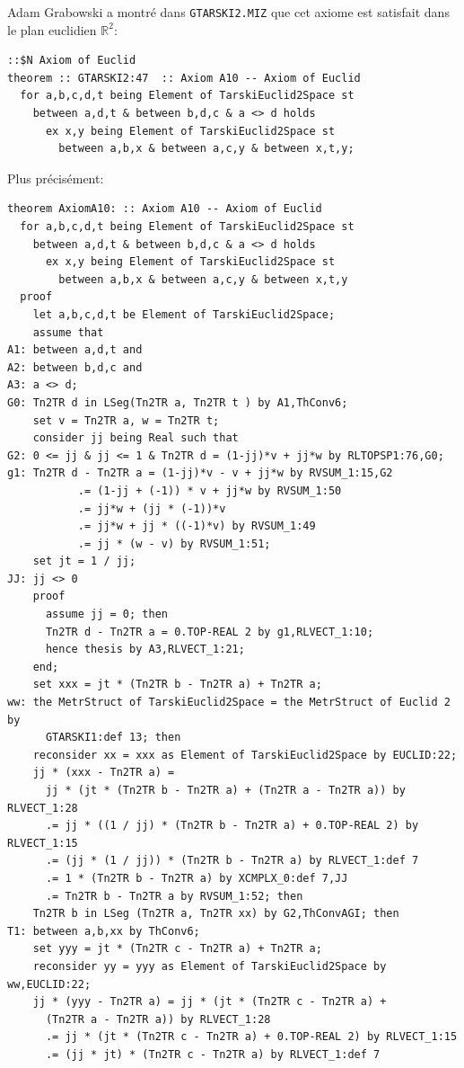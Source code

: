 \documentclass[8pt,a4paper]{article}
\theoremstyle{plain}
\begin{document}
Adam Grabowski a montré dans \verb+GTARSKI2.MIZ+\cite{DBLP:journals/fm/CoghettoG16} que
  cet axiome est satisfait dans le plan euclidien $\mathbb{R}^2$:
\begin{verbatim}
::$N Axiom of Euclid
theorem :: GTARSKI2:47  :: Axiom A10 -- Axiom of Euclid
  for a,b,c,d,t being Element of TarskiEuclid2Space st
    between a,d,t & between b,d,c & a <> d holds
      ex x,y being Element of TarskiEuclid2Space st
        between a,b,x & between a,c,y & between x,t,y;
\end{verbatim}
Plus précisément:
\begin{verbatim}
theorem AxiomA10: :: Axiom A10 -- Axiom of Euclid
  for a,b,c,d,t being Element of TarskiEuclid2Space st
    between a,d,t & between b,d,c & a <> d holds
      ex x,y being Element of TarskiEuclid2Space st
        between a,b,x & between a,c,y & between x,t,y
  proof
    let a,b,c,d,t be Element of TarskiEuclid2Space;
    assume that
A1: between a,d,t and
A2: between b,d,c and
A3: a <> d;
G0: Tn2TR d in LSeg(Tn2TR a, Tn2TR t ) by A1,ThConv6;
    set v = Tn2TR a, w = Tn2TR t;
    consider jj being Real such that
G2: 0 <= jj & jj <= 1 & Tn2TR d = (1-jj)*v + jj*w by RLTOPSP1:76,G0;
g1: Tn2TR d - Tn2TR a = (1-jj)*v - v + jj*w by RVSUM_1:15,G2
           .= (1-jj + (-1)) * v + jj*w by RVSUM_1:50
           .= jj*w + (jj * (-1))*v
           .= jj*w + jj * ((-1)*v) by RVSUM_1:49
           .= jj * (w - v) by RVSUM_1:51;
    set jt = 1 / jj;
JJ: jj <> 0
    proof
      assume jj = 0; then
      Tn2TR d - Tn2TR a = 0.TOP-REAL 2 by g1,RLVECT_1:10;
      hence thesis by A3,RLVECT_1:21;
    end;
    set xxx = jt * (Tn2TR b - Tn2TR a) + Tn2TR a;
ww: the MetrStruct of TarskiEuclid2Space = the MetrStruct of Euclid 2 by
      GTARSKI1:def 13; then
    reconsider xx = xxx as Element of TarskiEuclid2Space by EUCLID:22;
    jj * (xxx - Tn2TR a) =
      jj * (jt * (Tn2TR b - Tn2TR a) + (Tn2TR a - Tn2TR a)) by RLVECT_1:28
      .= jj * ((1 / jj) * (Tn2TR b - Tn2TR a) + 0.TOP-REAL 2) by RLVECT_1:15
      .= (jj * (1 / jj)) * (Tn2TR b - Tn2TR a) by RLVECT_1:def 7
      .= 1 * (Tn2TR b - Tn2TR a) by XCMPLX_0:def 7,JJ
      .= Tn2TR b - Tn2TR a by RVSUM_1:52; then
    Tn2TR b in LSeg (Tn2TR a, Tn2TR xx) by G2,ThConvAGI; then
T1: between a,b,xx by ThConv6;
    set yyy = jt * (Tn2TR c - Tn2TR a) + Tn2TR a;
    reconsider yy = yyy as Element of TarskiEuclid2Space by ww,EUCLID:22;
    jj * (yyy - Tn2TR a) = jj * (jt * (Tn2TR c - Tn2TR a) +
      (Tn2TR a - Tn2TR a)) by RLVECT_1:28
      .= jj * (jt * (Tn2TR c - Tn2TR a) + 0.TOP-REAL 2) by RLVECT_1:15
      .= (jj * jt) * (Tn2TR c - Tn2TR a) by RLVECT_1:def 7

\end{verbatim}
\end{document}
